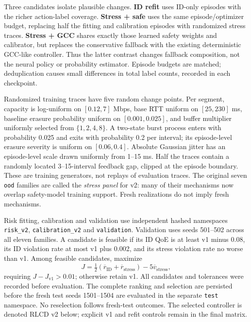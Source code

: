 \documentclass[10pt]{article}
\begin{document}
Three candidates isolate plausible changes. \textbf{ID refit} uses ID-only episodes with the richer action-label coverage. \textbf{Stress + safe} uses the same episode/optimizer budget, replacing half the fitting and calibration episodes with randomized stress traces. \textbf{Stress + GCC} shares exactly those learned safety weights and calibrator, but replaces the conservative fallback with the existing deterministic GCC-like controller. Thus the latter contrast changes fallback composition, not the neural policy or probability estimator. Episode budgets are matched; deduplication causes small differences in total label counts, recorded in each checkpoint.

Randomized training traces have five random change points. Per segment, capacity is log-uniform on $[0.12,7]$ Mbps, base RTT uniform on $[25,230]$ ms, baseline erasure probability uniform on $[0.001,0.025]$, and buffer multiplier uniformly selected from $\{1,2,4,8\}$. A two-state burst process enters with probability 0.025 and exits with probability 0.2 per interval; its episode-level erasure severity is uniform on $[0.06,0.4]$. Absolute Gaussian jitter has an episode-level scale drawn uniformly from 1--15 ms. Half the traces contain a randomly located 3--15-interval feedback gap, clipped at the episode boundary. These are training generators, not replays of evaluation traces. The original seven \texttt{ood} families are called the \emph{stress panel} for v2: many of their mechanisms now overlap safety-model training support. Fresh realizations do not imply fresh mechanisms.

Risk fitting, calibration and validation use independent hashed namespaces \texttt{risk\_v2}, \texttt{calibration\_v2} and \texttt{validation}. Validation uses seeds 501--502 across all eleven families. A candidate is feasible if its ID QoE is at least v1 minus 0.08, its ID violation rate at most v1 plus 0.002, and its stress violation rate no worse than v1. Among feasible candidates, maximize
\[
J=\tfrac12(\overline r_{\mathrm{ID}}+\overline r_{\mathrm{stress}})-5\overline v_{\mathrm{stress}},
\]
requiring $J-J_{\mathrm{v1}}>0.01$; otherwise retain v1. All candidates and tolerances were recorded before evaluation. The complete ranking and selection are persisted before the fresh test seeds 1501--1504 are evaluated in the separate \texttt{test} namespace. No reselection follows fresh-test outcomes. The selected controller is denoted RLCD v2 below; explicit v1 and refit controls remain in the final matrix.
\end{document}

